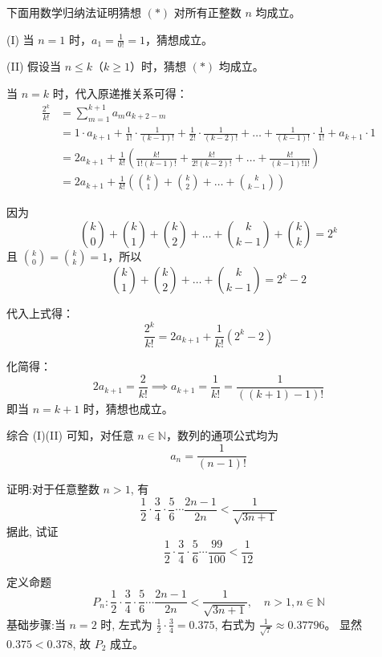 \begin{questions}
\begin{solution}
下面用数学归纳法证明猜想 $(*)$ 对所有正整数 $n$ 均成立。

(I) 当 $n=1$ 时，$a_1 = \frac{1}{0!} = 1$，猜想成立。

(II) 假设当 $n \le k$（$k \ge 1$）时，猜想 $(*)$ 均成立。

当 $n = k$ 时，代入原递推关系可得：
\begin{align*}
\frac{2^k}{k!} &= \sum_{m=1}^{k+1} a_m a_{k+2-m} \\
&= 1 \cdot a_{k+1} + \frac{1}{1!} \cdot \frac{1}{(k-1)!} + \frac{1}{2!} \cdot \frac{1}{(k-2)!} + \dots + \frac{1}{(k-1)!} \cdot \frac{1}{1!} + a_{k+1} \cdot 1 \\
&= 2a_{k+1} + \frac{1}{k!} \left( \frac{k!}{1!(k-1)!} + \frac{k!}{2!(k-2)!} + \dots + \frac{k!}{(k-1)! 1!} \right) \\
&= 2a_{k+1} + \frac{1}{k!} \left( \binom{k}{1} + \binom{k}{2} + \dots + \binom{k}{k-1} \right)
\end{align*}

因为
\[
\binom{k}{0} + \binom{k}{1} + \binom{k}{2} + \dots + \binom{k}{k-1} + \binom{k}{k} = 2^k
\]
且 $\binom{k}{0} = \binom{k}{k} = 1$，所以
\[
\binom{k}{1} + \binom{k}{2} + \dots + \binom{k}{k-1} = 2^k - 2
\]

代入上式得：
\[
\frac{2^k}{k!} = 2a_{k+1} + \frac{1}{k!} \left( 2^k - 2 \right)
\]

化简得：
\[
2a_{k+1} = \frac{2}{k!} \implies a_{k+1} = \frac{1}{k!} = \frac{1}{((k+1)-1)!}
\]
即当 $n = k + 1$ 时，猜想也成立。

综合 (I)(II) 可知，对任意 $n \in \mathbb{N}$，数列的通项公式均为
\[
a_n = \frac{1}{(n-1)!}
\]
\end{solution}

    \question 证明:对于任意整数 $n > 1$, 有
    \[ 
    \frac{1}{2} \cdot \frac{3}{4} \cdot \frac{5}{6} \cdots \frac{2n - 1}{2n} < \frac{1}{\sqrt{3n + 1}} 
    \]
    据此, 试证
    \[
    \frac{1}{2} \cdot \frac{3}{4} \cdot \frac{5}{6} \cdots \frac{99}{100} < \frac{1}{12}
    \]
    \begin{solution}
        定义命题 
        \[ 
        P_n: \frac{1}{2} \cdot \frac{3}{4} \cdot \frac{5}{6} \cdots \frac{2n - 1}{2n} < \frac{1}{\sqrt{3n + 1}},\quad n > 1, n \in \mathbb{N}
        \]
        基础步骤:当 $n = 2$ 时, 左式为 $\frac{1}{2} \cdot \frac{3}{4} = 0.375$, 右式为 $\frac{1}{\sqrt{7}} \approx 0.37796$。
        显然 $0.375 < 0.378$, 故 $P_2$ 成立。


\end{solution}
\end{questions}
